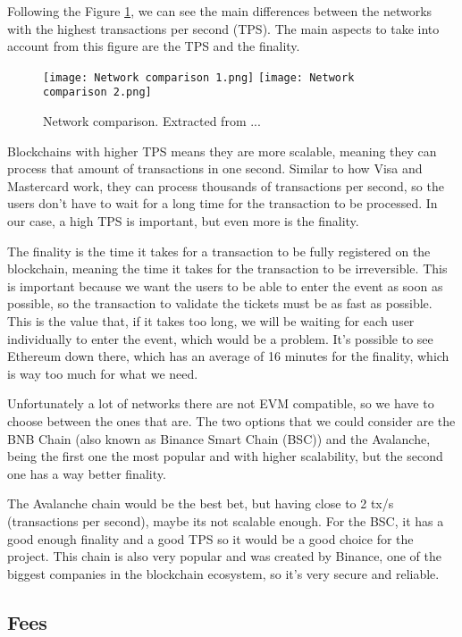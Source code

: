 Following the Figure \ref{fig:network_comparison}, we can see the main differences between the networks with the highest transactions per second (TPS). The main aspects to take into account from this figure are the TPS and the finality.

\begin{figure}[H]
    \texttt{[image: Network comparison 1.png]}
    \texttt{[image: Network comparison 2.png]}
    \centering
    \caption{Network comparison. Extracted from ...}
    \label{fig:network_comparison}
\end{figure}

Blockchains with higher TPS means they are more scalable, meaning they can process that amount of transactions in one second. Similar to how Visa and Mastercard work, they can process thousands of transactions per second, so the users don't have to wait for a long time for the transaction to be processed. In our case, a high TPS is important, but even more is the finality.

The finality is the time it takes for a transaction to be fully registered on the blockchain, meaning the time it takes for the transaction to be irreversible. This is important because we want the users to be able to enter the event as soon as possible, so the transaction to validate the tickets must be as fast as possible. This is the value that, if it takes too long, we will be waiting for each user individually to enter the event, which would be a problem. It's possible to see Ethereum down there, which has an average of 16 minutes for the finality, which is way too much for what we need.

Unfortunately a lot of networks there are not EVM compatible, so we have to choose between the ones that are. The two options that we could consider are the BNB Chain (also known as Binance Smart Chain (BSC)) and the Avalanche, being the first one the most popular and with higher scalability, but the second one has a way better finality.

The Avalanche chain would be the best bet, but having close to 2 tx/s (transactions per second), maybe its not scalable enough. For the BSC, it has a good enough finality and a good TPS so it would be a good choice for the project. This chain is also very popular and was created by Binance, one of the biggest companies in the blockchain ecosystem, so it's very secure and reliable.

\subsection{Fees}
\label{subsec:fees}

